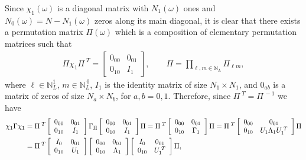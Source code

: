 \documentclass{cmslatex}
\begin{document}
Since $\chi_1(\omega)$ is a diagonal matrix with $N_1(\omega)$ ones and
$N_0(\omega)=N-N_1(\omega)$ zeros along its main diagonal, it is clear that
there exists a permutation matrix $\Pi(\omega)$ which is a composition of
elementary permutation matrices such that 
%
\begin{align}\label{eq:chi_Perm} 
  \Pi\chi_1\Pi^{\;T}= 
  \left[
  \begin{array}{ccc}
    0_{00}&0_{01}\\
    0_{10}&I_1   
    \end{array}
\right],
\qquad
\Pi=\prod_{\ell,m\in\mathbb{N}_L}\Pi_{\ell m},
\end{align}
%
where $\ell\in\mathbb{N}_L^1$, $m\in\mathbb{N}_L^{\,0}$, $I_1$ is the
identity matrix of size $N_1\times N_1$, and $0_{ab}$ is a matrix of zeros
of size $N_a\times N_b$, for $a,b=0,1$. Therefore, since  $\Pi^{\;T}=\Pi^{\,-1}$
we have 
%
\begin{align}\label{eq:Spec_Decomp_chi_Gamma_chi_Proof}
  \chi_1\Gamma\chi_1&=
  \Pi^{\;T}
  \left[
  \begin{array}{ccc}
    0_{00}&0_{01}\\
    0_{10}&I_1   
    \end{array}
\right]
\Gamma_\Pi
\left[
  \begin{array}{ccc}
    0_{00}&0_{01}\\
    0_{10}&I_1   
    \end{array}
\right]
\Pi
=
\Pi^{\;T}
\left[
  \begin{array}{ccc}
    0_{00}&0_{01}\\
    0_{10}&\Gamma_1   
    \end{array}
\right]
\Pi
=
\Pi^{\;T}
\left[
  \begin{array}{ccc}
    0_{00}&0_{01}\\
    0_{10}&U_1\Lambda_1U_1^{\;T} 
    \end{array}
\right]
\Pi
\notag\\
&=
\Pi^{\;T}
\left[
  \begin{array}{ccc}
    I_0&0_{01}\\
    0_{10}&U_1 
    \end{array}
\right]    
\left[
  \begin{array}{ccc}
    0_{00}&0_{01}\\
    0_{10}&\Lambda_1
    \end{array}
\right]    
\left[
  \begin{array}{ccc}
    I_0&0_{01}\\
    0_{10}&U_1^{\;T} 
    \end{array}
\right]    
\Pi,
\end{align}
\end{document}

